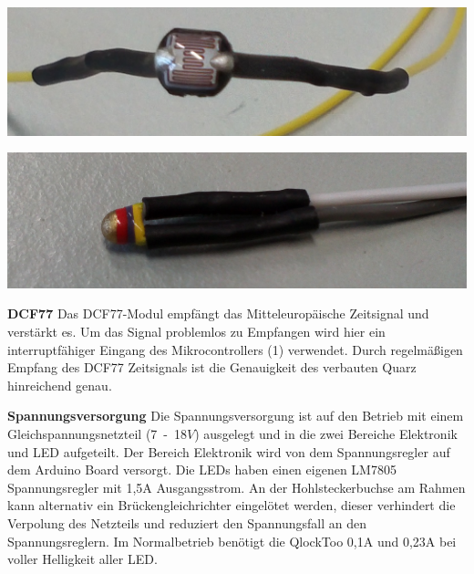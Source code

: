 \begin{multicols}{2}
{
\centering 
\includegraphics[width=0.9\columnwidth]{Abbildungen/Elektronik/LDR} 

}

{
\centering
\includegraphics[width=0.9\columnwidth]{Abbildungen/Elektronik/NTC} 

}

\textbf{DCF77} Das DCF77-Modul empfängt das Mitteleuropäische Zeitsignal und verstärkt es. Um das Signal problemlos zu Empfangen wird hier ein interruptfähiger Eingang des Mikrocontrollers (1) verwendet. Durch regelmäßigen Empfang des DCF77 Zeitsignals ist die Genauigkeit des verbauten Quarz hinreichend genau.\newline

\textbf{Spannungsversorgung} Die Spannungsversorgung ist auf den Betrieb mit einem Gleichspannungsnetzteil (7~-~18$V$) ausgelegt und in die zwei Bereiche Elektronik und LED aufgeteilt. Der Bereich Elektronik wird von dem Spannungsregler auf dem Arduino Board versorgt. Die LEDs haben einen eigenen LM7805 Spannungsregler mit 1,5A Ausgangsstrom. An der Hohlsteckerbuchse am Rahmen kann alternativ ein Brückengleichrichter eingelötet werden, dieser verhindert die Verpolung des Netzteils und reduziert den Spannungsfall an den Spannungsreglern. Im Normalbetrieb benötigt die QlockToo 0,1A und 0,23A bei voller Helligkeit aller LED. 

\end{multicols}

